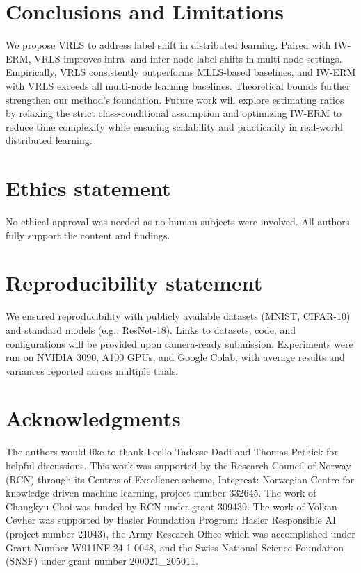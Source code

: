\section{Conclusions and Limitations}\label{sec:conc}

We propose VRLS to address label shift in distributed learning. Paired with IW-ERM, VRLS improves intra- and inter-node label shifts in multi-node settings. Empirically, VRLS consistently outperforms MLLS-based baselines, and IW-ERM with VRLS exceeds all multi-node learning baselines. Theoretical bounds further strengthen our method's foundation. Future work will explore estimating ratios by relaxing the strict class-conditional assumption and optimizing IW-ERM to reduce time complexity while ensuring scalability and practicality in real-world distributed learning.

\section*{Ethics statement}
No ethical approval was needed as no human subjects were involved. All authors fully support the content and findings.

\section*{Reproducibility statement}
We ensured reproducibility with publicly available datasets (MNIST, CIFAR-10) and standard models (e.g., ResNet-18). Links to datasets, code, and configurations will be provided upon camera-ready submission. Experiments were run on NVIDIA 3090, A100 GPUs, and Google Colab, with average results and variances reported across multiple trials. 

\section*{Acknowledgments}
The authors would like to thank Leello Tadesse Dadi and Thomas Pethick for helpful discussions. This work was supported by the Research Council of Norway (RCN) through its Centres of Excellence scheme, Integreat: Norwegian Centre for knowledge-driven machine learning, project number 332645.
The work of Changkyu Choi was funded by RCN under grant 309439.
The work of Volkan Cevher was supported by Hasler Foundation Program: Hasler Responsible AI (project number 21043), the Army Research Office which was accomplished under Grant Number W911NF-24-1-0048, and the Swiss National Science Foundation (SNSF) under grant number 200021\_205011.

